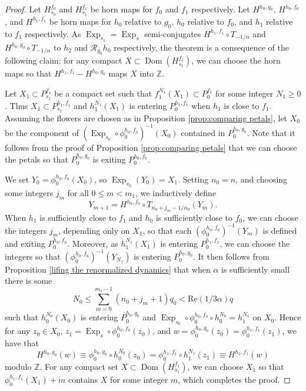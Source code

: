 \documentclass[10pt,a4paper]{amsart}
\DeclareMathOperator{\Dom}{Dom}
\DeclareMathOperator{\Exp}{Exp}
\newcommand{\RR}{\mathcal R}
\newcommand{\Z}{\mathbb Z}
\begin{document}
	\begin{proof}
		Let $H^{f_0}_{s_0}$ and $H^{f_1}_{s_1}$ be horn maps for $f_0$ and $f_1$ respectively. 
		Let $H^{h_0, g_0}$, $H^{h_0, f_0}$,  and $H^{h_1, f_1}$ be horn maps for $h_0$ relative to $g_0$, $h_0$ relative to $f_0$, and $h_1$ relative to $f_1$ respectively. As $\Exp_{s_1}= \Exp_{s}$ semi-conjugates $H^{h_1, f_1}\circ T_{-1/\alpha}$ and $H^{h_0, g_0}\circ T_{-1/\alpha}$ to $h_2$ and $\RR_{g_0}h_0$ respectively, the theorem is a consequence of the following  claim: for any compact $X\subset \Dom(H^{f_1}_{s_1})$, we can choose the horn maps so that 
		$H^{h_1, f_1}-H^{h_0, g_0}$ maps $X$ into $\Z$.
		
		Let $X_1\subset P_{s_1}^{f_1}$ be a compact set such that $f_1^{N_1}(X_1)\subset P_0^{f_1}$ 
		for some integer $N_1\geq 0$. 
		Thus $X_1\subset P_{s_1}^{h_1, f_1}$ and $h_1^{N_1}(X_1)$ is entering $P_0^{h_1, f_1}$ when $h_1$ is close to $f_1$. 
		Assuming the flowers are chosen as in Proposition \ref{prop:comparing petals}, let $X_0$ be the component of $(\Exp_{s_0}\circ \phi_0^{h_0, f_0})^{-1}(X_0)$ contained in $P_0^{h_0, g_0}$.
		Note that it follows from the proof of Proposition \ref{prop:comparing petals} that we can choose the petals so that $P_0^{h_0, g_0}$ is exiting $P_0^{h_0, f_0}$.
		
		
		
		We set $Y_0= \phi_0^{h_0, f_0}(X_0)$, so $\Exp_{s_0}(Y_0)= X_1$. 
		Setting $n_0 = n$, and 
		choosing some integers $j_m$ for all $0\leq m < m_1$, we inductively define $$Y_{m+1} = H^{h_0, f_0}\circ T_{n_0+j_m-1/\alpha_0} (Y_m).$$
		When $h_1$ is sufficiently close to $f_1$ and $h_0$ is sufficiently close to $f_0$, we can choose the integers $j_m$, depending only on $X_1$, so that each $(\phi_0^{h_0, f_0})^{-1}(Y_m)$ is defined and exiting $P_0^{h_0, f_0}$. 
		Moreover, as $h_1^{N_1}(X_1)$ is entering $P_0^{h_1, f_1}$, we can choose the integers so that $(\phi_0^{h_0, f_0})^{-1}(Y_{N_1})$ is entering $P_0^{h_0, g_0}$.
		It then follows from Proposition \ref{lifing the renormalized dynamics} that when $\alpha$ is sufficiently small there is some $$N_0\leq \sum_{m=0}^{m_1-1}(n_0+j_m+1)q_0< \text{Re}(1/3\alpha)q$$
		such that $h_0^{N_0}(X_0)$ is entering $P_0^{h_0, g_0}$
		and $\Exp_{s_0}\circ \phi_0^{h_0, f_0}\circ h_0^{N_0} = h_1^{N_1}$ on $X_0$. 
		Hence for any $z_0\in X_0$, $z_1 = \Exp_s\circ \phi_0^{h_0, f_0}(z_0)$, and $w= \phi_0^{h_0, g_0}(z_0) = \phi_0^{h_1, f_1}(z_1)$, we have that 
		$$H^{h_0, g_0}(w) \equiv \phi_0^{h_0, g_0}\circ h_0^{N_0}(z_0) = \phi_0^{h_1, f_1}\circ h_1^{N_1}(z_1)\equiv H^{h_1, f_1}(w)$$
		modulo $\Z$. For any compact set $X\subset \Dom(H^{f_1}_{s_1})$, we can choose $X_1$ so that $\phi_0^{h_1, f_1}(X_1)+m$ contains $X$ for some integer $m$, which completes the proof.
	\end{proof}
\end{document}
